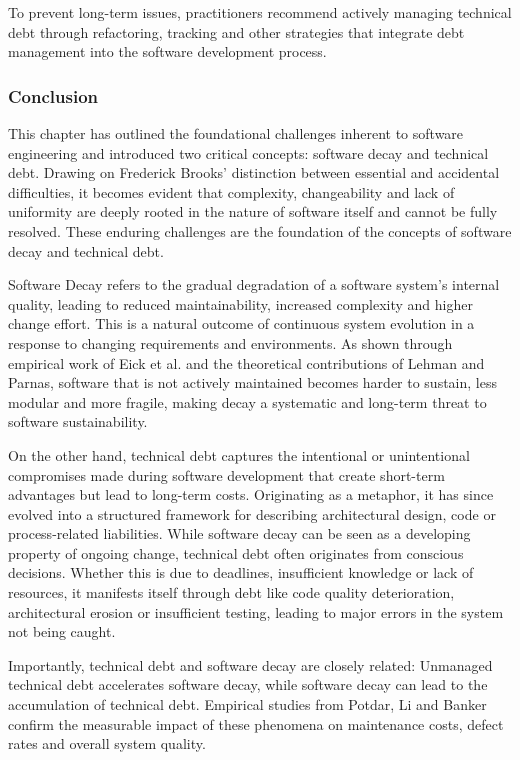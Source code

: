 To prevent long-term issues, practitioners recommend actively managing technical debt through refactoring, tracking and other strategies that integrate debt management into the software development process.

\subsubsection{Conclusion}
This chapter has outlined the foundational challenges inherent to software engineering and introduced two critical concepts: software decay and technical debt.
Drawing on Frederick Brooks' distinction between essential and accidental difficulties, it becomes evident that complexity, changeability and lack of uniformity are deeply rooted in the nature of software itself and cannot be fully resolved.
These enduring challenges are the foundation of the concepts of software decay and technical debt.

Software Decay refers to the gradual degradation of a software system's internal quality, leading to reduced maintainability, increased complexity and higher change effort. This is a natural outcome of continuous system evolution in a response to changing requirements and environments.
As shown through empirical work of Eick et al. and the theoretical contributions of Lehman and Parnas, software that is not actively maintained becomes harder to sustain, less modular and more fragile, making decay a systematic and long-term threat to software sustainability.

On the other hand, technical debt captures the intentional or unintentional compromises made during software development that create short-term advantages but lead to long-term costs. Originating as a metaphor, it has since evolved into a structured framework for describing architectural design, code or process-related liabilities.
While software decay can be seen as a developing property of ongoing change, technical debt often originates from conscious decisions. Whether this is due to deadlines, insufficient knowledge or lack of resources, it manifests itself through debt like code quality deterioration, architectural erosion or insufficient testing, leading to major errors in the system not being caught.

Importantly, technical debt and software decay are closely related: Unmanaged technical debt accelerates software decay, while software decay can lead to the accumulation of technical debt. Empirical studies from Potdar, Li and Banker confirm the measurable impact of these phenomena on maintenance costs, defect rates and overall system quality.

